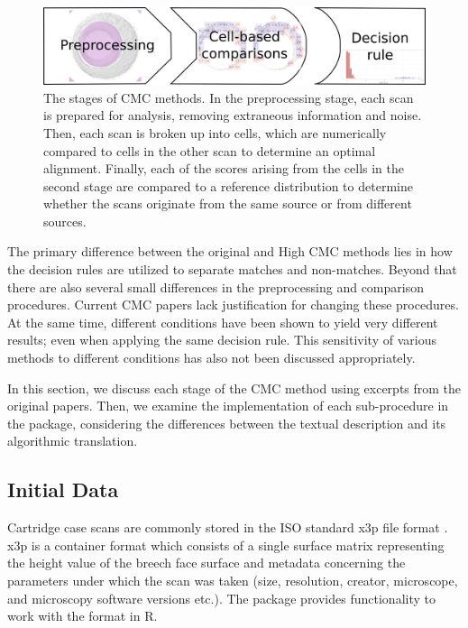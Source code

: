 \begin{figure}
\centering
\includegraphics[width=.8\textwidth]{images/overview-flow.png}
\caption{The stages of CMC methods. In the preprocessing stage, each scan is prepared for analysis, removing extraneous information and noise. Then, each scan is broken up into cells, which are numerically compared to cells in the other scan to determine an optimal alignment. Finally, each of the scores arising from the cells in the second stage are compared to a reference distribution to determine whether the scans originate from the same source or from different sources.\label{fig:overview-flow}}
\end{figure}

The primary difference between the original and High CMC methods lies in
how the decision rules are utilized to separate matches and non-matches.
Beyond that there are also several small differences in the
preprocessing and comparison procedures. Current CMC papers lack
justification for changing these procedures. At the same time, different
conditions have been shown to yield very different results; even when
applying the same decision rule. This sensitivity of various methods to
different conditions has also not been discussed appropriately.

In this section, we discuss each stage of the CMC method using excerpts
from the original papers. Then, we examine the implementation of each
sub-procedure in the  package, considering the differences
between the textual description and its algorithmic translation.

\hypertarget{initialData}{%
\subsection{Initial Data}\label{initialData}}

Cartridge case scans are commonly stored in the ISO standard x3p file
format \citep{ISO25178-72}. x3p is a container format which consists of
a single surface matrix representing the height value of the breech face
surface and metadata concerning the parameters under which the scan was
taken (size, resolution, creator, microscope, and microscopy software
versions etc.). The  package \citep{x3ptools} provides
functionality to work with the format in R.

